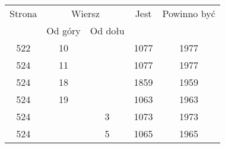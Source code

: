\documentclass[a4paper,11pt]{article}
\numberwithin{equation}{section}
\begin{document}
\begin{center}
  \newpage

  \begin{tabular}{|c|c|c|c|c|}
    \hline
    Strona & \multicolumn{2}{c|}{Wiersz} & Jest
                              & Powinno być \\ \cline{2-3}
    & Od góry & Od dołu & & \\
    \hline
    522 & 10 & & 1077 & 1977 \\
    524 & 11 & & 1077 & 1977 \\
    524 & 18 & & 1859 & 1959 \\
    524 & 19 & & 1063 & 1963 \\
    524 & & \hphantom{0}3 & 1073 & 1973 \\
    524 & & \hphantom{0}5 & 1065 & 1965 \\
    \hline
  \end{tabular}

\end{center}

\vspace{\spaceTwo}
\end{document}
